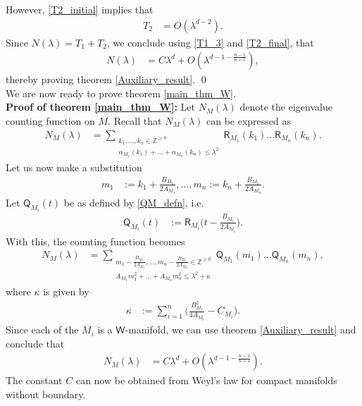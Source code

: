 \documentclass[11pt,lettersize,reqno,fullpage]{amsart}
\providecommand \hf{\hspace*{0.5cm}}
\begin{document}
However, \eqref{T2_initial} implies that 
\begin{align} 
T_2 & = O(\lambda^{d-2}). \label{T2_final}
\end{align}
Since $N(\lambda) = T_1+T_2$, we conclude using \eqref{T1_3} and \eqref{T2_final}, that 
\begin{align}
N(\lambda) & = C \lambda^{d} + O(\lambda^{d-1-\frac{n-1}{n+1}}),
\end{align}
thereby proving theorem \ref{Auxiliary_result}. \qed\\  
\hf \hf We are now ready to prove theorem \ref{main_thm_W}. \\ 

\noindent \textbf{Proof of theorem \ref{main_thm_W}:} Let $N_M(\lambda)$ denote the eigenvalue counting function on $M$. 
Recall that $N_M(\lambda) $ can be expressed as 
\begin{align} 
N_M(\lambda) & = \sum_{\substack{k_1, \ldots, k_n \in \mathbb{Z}^{\geq 0}\\ 
 \alpha_{M_1}(k_1) + \ldots + \alpha_{M_n}(k_n) \leq \lambda^2}} \mathsf{R}_{M_1}(k_1) \ldots \mathsf{R}_{M_n}(k_n). 
\end{align}
Let us now make a substitution 
\begin{align} 
m_1 &:= k_1 + \frac{B_{M_1}}{2 A_{M_1}}, \ldots, m_n := k_n + \frac{B_{M_n}}{2 A_{M_n}}.
\end{align}
Let $\mathsf{Q}_{M_i}(t)$ be as defined by \eqref{QM_defn}, i.e. 
\begin{align} 
\mathsf{Q}_{M_i}(t)&:= \mathsf{R}_{M_i}\Big(t - \frac{B_{M_i}}{2 A_{M_i}} \Big).
\end{align}
With this, the counting function becomes 
\begin{align}
N_M(\lambda) & = \sum_{\substack{m_1-\frac{B_{M_1}}{2A_{M_1}}, \ldots, m_n-\frac{B_{M_n}}{2A_{M_n}} 
\in \mathbb{Z}^{\geq 0}\\ A_{M_{1}} m_1^2 + \ldots + A_{M_{n}} m_n^2 \leq \lambda^2 + \kappa}}
\mathsf{Q}_{M_1}(m_1) \ldots \mathsf{Q}_{M_n}(m_n), 
\end{align}
where $\kappa$ is given by 
\begin{align*}
\kappa & := \sum_{i=1}^{n}\Big(\frac{B_{M_i}^2}{4 A_{M_{i}}} - C_{M_i}\Big). 
\end{align*}
Since each of the $M_i$ is a 
$\mathsf{W}$-manifold, we can use theorem \ref{Auxiliary_result} 
and conclude that 
\begin{align}
N_M(\lambda) & = C\lambda^d + O(\lambda^{d-1-\frac{n-1}{n+1}}).
\end{align}
The constant $C$ can now be obtained from Weyl's law for compact manifolds without boundary.  
\end{document}
